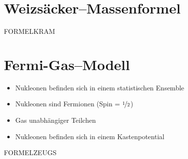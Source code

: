 \documentclass[BCOR=5mm,DIV=calc,listof=totoc,headings=big]{scrartcl}
\begin{document}
\section{Weizsäcker--Massenformel}
\label{sec:weizs-mass}
FORMELKRAM

\section{Fermi-Gas--Modell}
\label{sec:fermi-gas-modell}
\begin{itemize}
\item Nukleonen befinden sich in einem statistischen Ensemble
\item Nukleonen sind Fermionen (Spin = $\nicefrac{1}{2}$)
\item Gas unabhängiger Teilchen
\item Nukleonen befinden sich in einem Kastenpotential
\end{itemize}
FORMELZEUGS
\end{document}
